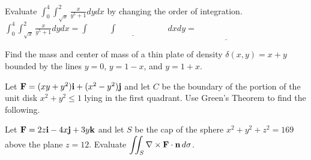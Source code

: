 \documentclass[12pt]{exam}
\newcommand{\ve}[1]{{\bf #1}}
\begin{document}
\begin{questions}
\question[15] Evaluate 
$\displaystyle\int_0^4\int_{\sqrt{x}}^2\frac{x}{y^5+1}dydx$
by changing the order of integration.
\vfill
$\displaystyle\int_0^4\int_{\sqrt{x}}^2\frac{x}{y^5+1}dydx
=\underline{\int\hspace{1cm}\int\hspace{1in}dxdy}
=\underline{\phantom{\int}\hspace{1in}}$
\newpage

\question[15] Find the mass and center of mass of a
thin plate of density $\delta(x,y)=x+y$
bounded by the lines $y=0$, $y=1-x$, and $y=1+x$.
\vfill
{}
\newpage

\question[15] Let $\ve{F}=(xy+y^2)\ve{i}+(x^2-y^2)\ve{j}$ and 
let $C$ be the boundary of the portion of the unit disk
$x^2+y^2\le 1$ lying in the first quadrant.
Use Green's Theorem to find the following.

\newpage

\question[15] Let $\ve{F}=2z\ve{i}-4x\ve{j}+3y\ve{k}$ and let $S$ 
be the cap of the sphere $x^2+y^2+z^2=169$ above the plane $z=12$.
Evaluate $\displaystyle\iint_S\nabla\times \ve{F}\cdot\ve{n}\,d\sigma$.
\vfill
\uplevel{\makebox[\textwidth]
{$\displaystyle\iint_S\nabla\times
\ve{F}\cdot\ve{n}\,d\sigma=$\enspace\hrulefill}}

\end{questions}
\end{document}
